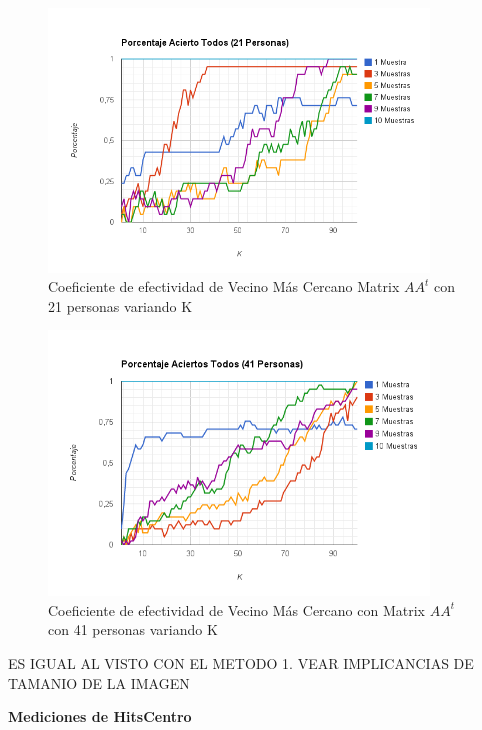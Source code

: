 \begin{figure}[H]
\includegraphics[width=0.9\textwidth]{img/imagef11.png}
     \caption{Coeficiente de efectividad de Vecino Más Cercano Matrix $AA^t$ con 21 personas variando K}
\end{figure}

\begin{figure}[H]
\includegraphics[width=0.9\textwidth]{img/imagef12.png}
     \caption{Coeficiente de efectividad de Vecino Más Cercano con Matrix $AA^t$ con 41 personas variando K}
\end{figure}

ES IGUAL AL VISTO CON EL METODO 1. VEAR IMPLICANCIAS DE TAMANIO DE LA IMAGEN

\textbf{Mediciones de HitsCentro }

